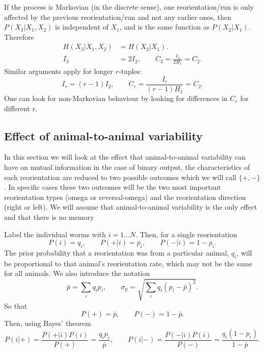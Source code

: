 \documentclass[12pt]{article}
\begin{document}
If the process is Markovian (in the discrete sense), \ie one reorientation/run is only affected by the previous reorientation/run and not any earlier ones, then $P(X_3 \vert X_1,X_2)$ is independent of $X_1$, and is the same function as $P(X_2 \vert X_1)$. Therefore
%
\begin{equation}\label{eq:tripvspair}
  \begin{aligned}
    H(X_3|X_1,X_2) &= H(X_2|X_1).\\
    I_3 &= 2I_2, \qquad C_3 = \frac{I_3}{2H_1} = C_2.
  \end{aligned}
\end{equation}
%
Similar arguments apply for longer $r$-tuples:
 \begin{equation}\label{eq:markovinf}
   I_r = (r-1)I_2, \qquad C_r = \frac{I_r}{(r-1)H_1} = C_2.
\end{equation}
%
One can look for non-Markovian behaviour by looking for differences in $C_r$ for different $r$.


\subsection{Effect of animal-to-animal variability}\label{sec:variability}

In this section we will look at the effect that animal-to-animal variability can have on mutual information in the case of binary output, \ie the characteristics of each reorientation are reduced to two possible outcomes which we will call $\{+,-\}$. In specific cases these two outcomes will be the two most important reorientation types (omega or reversal-omega) and the reorientation direction (right or left). We will assume that animal-to-animal variability is the only effect and that there is no memory

Label the individual worms with $i=1\ldots N$. Then, for a single reorientation
%
\begin{equation}\label{eq:varisinglereo}
  P(i) = q_i, \qquad
  P(+|i) = p_i, \qquad
  P(-|i) = 1-p_i.
\end{equation}
%
The prior probability that a reorientation was from a particular animal, $q_i$, will be proportional to that animal's reorientation rate, which may not be the same for all animals. We also introduce the notation
%
\begin{equation}\label{eq:varinot}
  \bar{p} = \sum_i q_i p_i, \qquad
  \sigma_p = \sqrt{\sum_i q_i(p_i-\bar{p})^2}.
\end{equation}
%
So that
%
\begin{equation}\label{eq:varimarg}
  P(+) = \bar{p}, \qquad P(-) = 1-\bar{p}.
\end{equation}
%
Then, using Bayes' theorem
%
\begin{equation}\label{eq:singlereobayes}
  P(i|+) = \frac{P(+|i)P(i)}{P(+)} = \frac{q_ip_i}{\bar{p}}, \qquad
  P(i|-) = \frac{P(-|i)P(i)}{P(-)} = \frac{q_i(1-p_i)}{1-\bar{p}}.
\end{equation}
%
\end{document}
